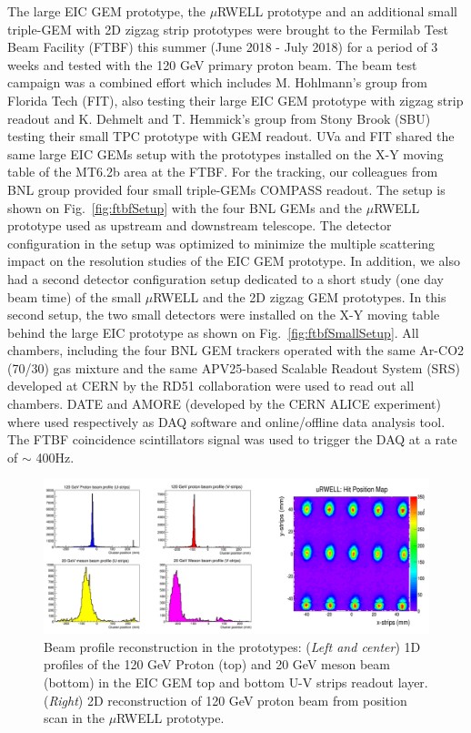 %
The large EIC GEM prototype, the $\mu$RWELL prototype  and an additional small triple-GEM with 2D zigzag strip prototypes were brought to the Fermilab Test Beam Facility (FTBF) this summer (June 2018 - July 2018) for a period of 3 weeks and tested with the 120 GeV primary proton beam. The beam test campaign was a combined effort which includes M. Hohlmann's group  from Florida Tech (FIT), also testing  their large EIC GEM prototype with zigzag strip readout and K. Dehmelt and T. Hemmick's group from Stony Brook (SBU) testing their small TPC prototype with GEM readout. UVa and FIT shared the same large EIC GEMs setup with the prototypes installed on the X-Y moving table of the  MT6.2b area at the FTBF. For the tracking, our colleagues from BNL group provided four small triple-GEMs COMPASS readout. The setup is shown on  Fig.~\ref{fig:ftbfSetup}  with the four BNL GEMs and the $\mu$RWELL prototype used as upstream and downstream telescope. The detector configuration in the setup  was optimized to minimize the  multiple scattering impact on the resolution studies of the EIC GEM prototype. In addition, we also had a second detector configuration setup dedicated to a short study (one day beam time) of the small  $\mu$RWELL and the 2D zigzag GEM prototypes. In this second setup, the two small detectors were installed on the X-Y moving table behind the large EIC prototype as shown on Fig.~\ref{fig:ftbfSmallSetup}. All chambers, including the four BNL GEM trackers operated with the same Ar-CO2 (70/30) gas mixture and the same APV25-based Scalable Readout System (SRS) developed at CERN by the RD51 collaboration were used to read out all chambers. DATE and AMORE (developed by the CERN ALICE experiment) where used respectively as DAQ software and online/offline data analysis tool. The FTBF coincidence scintillators signal was used to trigger the DAQ at a rate of $\sim$ 400Hz.\\
%
\begin{figure}[htb]
\centering
\includegraphics[width=1\columnwidth,trim={0pt 0mm 0pt 0mm},clip]{UVa_plots/ftbfBeamPosScan}
\caption{\label{fig:ftbfBeamPosScan} Beam profile reconstruction in the prototypes: ({\it Left and center}) 1D profiles of the 120 GeV Proton (top) and 20 GeV meson beam (bottom) in the EIC GEM top and bottom U-V strips readout layer. ({\it Right}) 2D reconstruction of 120 GeV proton beam from position scan in the $\mu$RWELL prototype.}
\end{figure}
